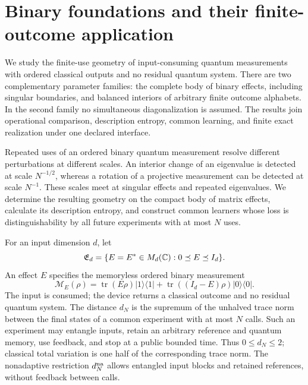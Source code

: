 \section{Binary foundations and their finite-outcome application}

We study the finite-use geometry of input-consuming quantum
measurements with ordered classical outputs and no residual quantum
system.  There are two complementary parameter families: the complete
body of binary effects, including singular boundaries, and balanced
interiors of arbitrary finite outcome alphabets.  In the second family
no simultaneous diagonalization is assumed.  The results join
operational comparison, description entropy, common learning, and
finite exact realization under one declared interface.

Repeated uses of an ordered binary quantum measurement resolve
different perturbations at different scales.  An interior change of
an eigenvalue is detected at scale $N^{-1/2}$, whereas a rotation of
a projective measurement can be detected at scale $N^{-1}$.  These
scales meet at singular effects and repeated eigenvalues.  We
determine the resulting geometry on the compact body of matrix
effects, calculate its description entropy, and construct common
learners whose loss is distinguishability by all future experiments
with at most $N$ uses.

For an input dimension $d$, let
\[
 \mathfrak E_d=\{E=E^*\in M_d(\mathbb C):0\preceq E\preceq I_d\}.
\]
An effect $E$ specifies the memoryless ordered binary measurement
\[
 \mathcal M_E(\rho)=\operatorname{tr}(E\rho)|1\rangle\langle1|
       +\operatorname{tr}((I_d-E)\rho)|0\rangle\langle0|.
\]
The input is consumed; the device returns a classical outcome and
no residual quantum system.  The distance $d_N$ is the supremum
of the unhalved trace norm between the final states of a common
experiment with at most $N$ calls.  Such an experiment may entangle
inputs, retain an arbitrary reference and quantum memory, use
feedback, and stop at a public bounded time.  Thus $0\le d_N\le2$;
classical total variation is one half of the corresponding trace
norm.  The nonadaptive restriction $d_N^{\rm na}$ allows entangled
input blocks and retained references, without feedback between calls.

